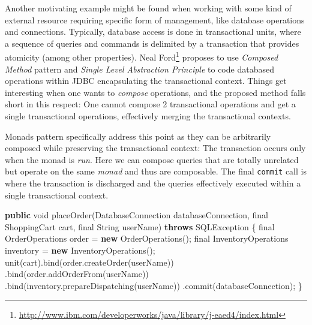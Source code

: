 \documentclass[11pt,]{article}
\newenvironment{Shaded}{}{}
\newcommand{\KeywordTok}[1]{\textcolor[rgb]{0.00,0.44,0.13}{\textbf{{#1}}}}
\newcommand{\DataTypeTok}[1]{\textcolor[rgb]{0.56,0.13,0.00}{{#1}}}
\newcommand{\FunctionTok}[1]{\textcolor[rgb]{0.02,0.16,0.49}{{#1}}}
\newcommand{\NormalTok}[1]{{#1}}
\renewcommand{\href}[2]{#2\footnote{\url{#1}}}
\begin{document}
Another motivating example might be found when working with some kind of
external resource requiring specific form of management, like database
operations and connections. Typically, database access is done in
transactional units, where a sequence of queries and commands is
delimited by a transaction that provides atomicity (among other
properties).
\href{http://www.ibm.com/developerworks/java/library/j-eaed4/index.html}{Neal
Ford} proposes to use \emph{Composed Method} pattern and \emph{Single
Level Abstraction Principle} to code databased operations within JDBC
encapsulating the transactional context. Things get interesting when one
wants to \emph{compose} operations, and the proposed method falls short
in this respect: One cannot compose 2 transactional operations and get a
single transactional operations, effectively merging the transactional
contexts.

Monads pattern specifically address this point as they can be
arbitrarily composed while preserving the transactional context: The
transaction occurs only when the monad is \emph{run}. Here we can
compose queries that are totally unrelated but operate on the same
\emph{monad} and thus are composable. The final \texttt{commit} call is
where the transaction is discharged and the queries effectively executed
within a single transactional context.

\begin{Shaded}
\begin{Highlighting}[]
\KeywordTok{public} \DataTypeTok{void} \FunctionTok{placeOrder}\NormalTok{(DatabaseConnection databaseConnection, }
          \DataTypeTok{final} \NormalTok{ShoppingCart cart, }
          \DataTypeTok{final} \NormalTok{String userName) }\KeywordTok{throws} \NormalTok{SQLException \{}
  \DataTypeTok{final} \NormalTok{OrderOperations order = }\KeywordTok{new} \FunctionTok{OrderOperations}\NormalTok{();}
  \DataTypeTok{final} \NormalTok{InventoryOperations inventory = }\KeywordTok{new} \FunctionTok{InventoryOperations}\NormalTok{();}
  \FunctionTok{unit}\NormalTok{(cart).}\FunctionTok{bind}\NormalTok{(order.}\FunctionTok{createOrder}\NormalTok{(userName))}
    \NormalTok{.}\FunctionTok{bind}\NormalTok{(order.}\FunctionTok{addOrderFrom}\NormalTok{(userName))}
    \NormalTok{.}\FunctionTok{bind}\NormalTok{(inventory.}\FunctionTok{prepareDispatching}\NormalTok{(userName))}
    \NormalTok{.}\FunctionTok{commit}\NormalTok{(databaseConnection);}
\NormalTok{\}}
\end{Highlighting}
\end{Shaded}
\end{document}
